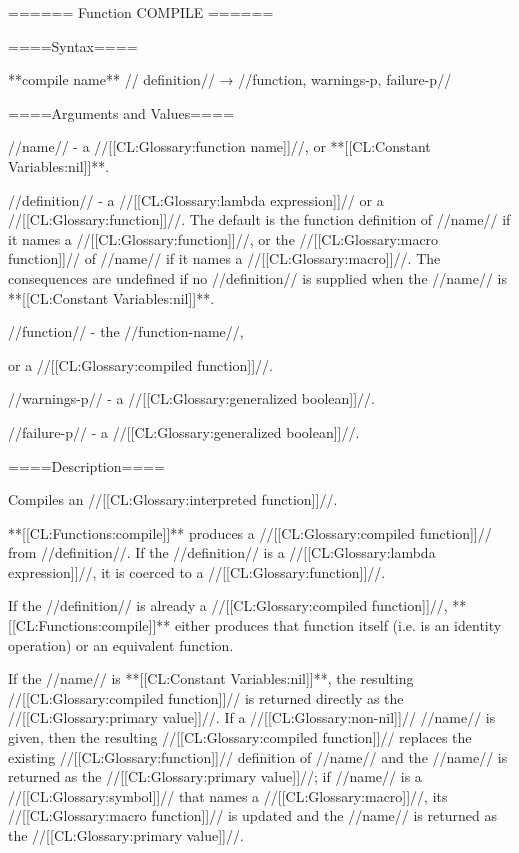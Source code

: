 ====== Function COMPILE ======

====Syntax====

**compile {name** //\opt} definition// → //function, warnings-p, failure-p//

====Arguments and Values====

//name// - a //[[CL:Glossary:function name]]//, or **[[CL:Constant Variables:nil]]**.


//definition// - a //[[CL:Glossary:lambda expression]]// or a //[[CL:Glossary:function]]//. The default is the function definition of //name// if it names a //[[CL:Glossary:function]]//, or the //[[CL:Glossary:macro function]]// of //name// if it names a //[[CL:Glossary:macro]]//. The consequences are undefined if no //definition// is supplied when the //name// is **[[CL:Constant Variables:nil]]**.

//function// - the //function-name//,

or a //[[CL:Glossary:compiled function]]//.

//warnings-p// - a //[[CL:Glossary:generalized boolean]]//.

//failure-p// - a //[[CL:Glossary:generalized boolean]]//.

====Description====

Compiles an //[[CL:Glossary:interpreted function]]//.

**[[CL:Functions:compile]]** produces a //[[CL:Glossary:compiled function]]// from //definition//. If the //definition// is a //[[CL:Glossary:lambda expression]]//, it is coerced to a //[[CL:Glossary:function]]//.

If the //definition// is already a //[[CL:Glossary:compiled function]]//, **[[CL:Functions:compile]]** either produces that function itself (i.e. is an identity operation) or an equivalent function.


If the //name// is **[[CL:Constant Variables:nil]]**, the resulting //[[CL:Glossary:compiled function]]// is returned directly as the //[[CL:Glossary:primary value]]//. If a //[[CL:Glossary:non-nil]]// //name// is given, then the resulting //[[CL:Glossary:compiled function]]// replaces the existing //[[CL:Glossary:function]]// definition of //name// and the //name// is returned as the //[[CL:Glossary:primary value]]//; if //name// is a //[[CL:Glossary:symbol]]// that names a //[[CL:Glossary:macro]]//, its //[[CL:Glossary:macro function]]// is updated and the //name// is returned as the //[[CL:Glossary:primary value]]//.


